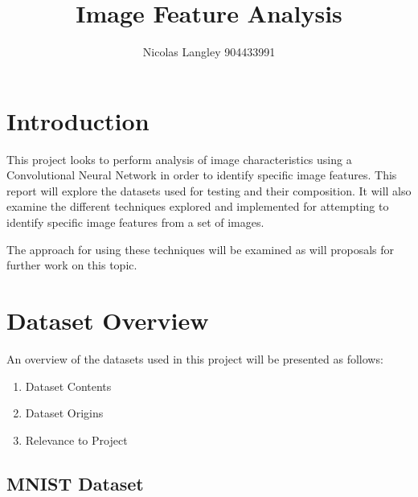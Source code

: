 \documentclass[12pt, titlepage]{article}
\begin{document}
\title{Image Feature Analysis}
\author{Nicolas Langley 904433991}
\maketitle
\section{Introduction}

This project looks to perform analysis of image characteristics using a Convolutional
Neural Network in order to identify specific image features. This report will explore the datasets used
for testing and their composition. It will also examine the different techniques explored and implemented for
attempting to identify specific image features from a set of images.

The approach for using these techniques will be examined as will proposals for further work on this topic.

\section{Dataset Overview}

An overview of the datasets used in this project will be presented as follows:
\begin{enumerate}
  \item Dataset Contents
  \item Dataset Origins
  \item Relevance to Project
\end{enumerate}

\subsection{MNIST Dataset}
\end{document}
